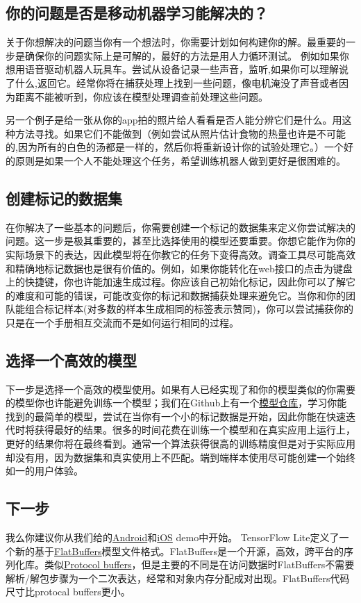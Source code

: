 \subsection{你的问题是否是移动机器学习能解决的？}
关于你想解决的问题当你有一个想法时，你需要计划如何构建你的解。最重要的一步是确保你的问题实际上是可解的，最好的方法是用人力循环测试。
例如如果你想用语音驱动机器人玩具车。尝试从设备记录一些声音，监听,如果你可以理解说了什么,返回它。经常你将在捕获处理上找到一些问题，像电机淹没了声音或者因为距离不能被听到，你应该在模型处理调查前处理这些问题。

另一个例子是给一张从你的app拍的照片给人看看是否人能分辨它们是什么。用这种方法寻找。如果它们不能做到（例如尝试从照片估计食物的热量也许是不可能的,因为所有的白色的汤都是一样的，然后你将重新设计你的试验处理它。）一个好的原则是如果一个人不能处理这个任务，希望训练机器人做到更好是很困难的。
\subsection{创建标记的数据集}
在你解决了一些基本的问题后，你需要创建一个标记的数据集来定义你尝试解决的问题。这一步是极其重要的，甚至比选择使用的模型还要重要。你想它能作为你的实际场景下的表达，因此模型将在你教它的任务下变得高效。调查工具尽可能高效和精确地标记数据也是很有价值的。例如，如果你能转化在web接口的点击为键盘上的快捷键，你也许能加速生成过程。你应该自己初始化标记，因此你可以了解它的难度和可能的错误，可能改变你的标记和数据捕获处理来避免它。当你和你的团队能组合标记样本(对多数的样本生成相同的标签表示赞同)，你可以尝试捕获你的只是在一个手册相互交流而不是如何运行相同的过程。
\subsection{选择一个高效的模型}
下一步是选择一个高效的模型使用。如果有人已经实现了和你的模型类似的你需要的模型你也许能避免训练一个模型；我们在Github上有一个\href{https://github.com/tensorflow/models}{模型仓库}，学习你能找到的最简单的模型，尝试在当你有一个小的标记数据是开始，因此你能在快速迭代时将获得最好的结果。很多的时间花费在训练一个模型和在真实应用上运行上，更好的结果你将在最终看到。通常一个算法获得很高的训练精度但是对于实际应用却没有用，因为数据集和真实使用上不匹配。端到端样本使用尽可能创建一个始终如一的用户体验。
\subsection{下一步}
我么你建议你从我们给的\href{https://www.tensorflow.org/mobile/android_build?hl=zh-cn}{Android}和\href{https://www.tensorflow.org/mobile/ios_build?hl=zh-cn}{iOS} demo中开始。
TensorFlow Lite定义了一个新的基于\href{https://google.github.io/flatbuffers/}{FlatBuffers}模型文件格式。FlatBuffers是一个开源，高效，跨平台的序列化库。类似\href{https://developers.google.com/protocol-buffers/?hl=en}{Protocol buffers}，但是主要的不同是在访问数据时FlatBuffers不需要解析/解包步骤为一个二次表达，经常和对象内存分配成对出现。FlatBuffers代码尺寸比protocal buffers更小。


